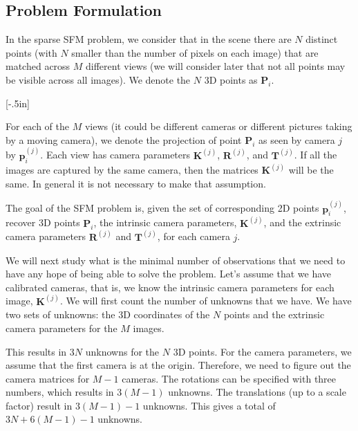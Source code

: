 
\subsection{Problem Formulation}

In the sparse SFM problem, we consider that in the scene there are $N$ distinct points (with $N$ smaller than the number of pixels on each image) that are matched across $M$ different views (we will consider later that not all points may be visible across all images). We denote the $N$ 3D points as $\mathbf{P}_i$.

[-.5in] 

For each of the $M$ views (it could be different cameras or different pictures taking by a moving camera), we denote the projection of point $\mathbf{P}_i$ as seen by camera $j$ by $\mathbf{p}^{(j)}_i$. Each view has camera parameters ${\mathbf K}^{(j)}$, ${\mathbf R}^{(j)}$, and ${\mathbf T}^{(j)}$. If all the images are captured by the same camera, then the matrices ${\mathbf K}^{(j)}$ will be the same. In general it is not necessary to make that assumption.  

The goal of the SFM problem is, given the set of corresponding 2D points $\mathbf{p}^{(j)}_i$, recover 3D points $\mathbf{P}_i$, the intrinsic camera parameters, ${\mathbf K}^{(j)}$, and the extrinsic camera parameters ${\mathbf R}^{(j)}$ and ${\mathbf T}^{(j)}$, for each camera $j$.

We will next study what is the minimal number of observations that we need to have any hope of being able to solve the problem. Let's assume that we have calibrated cameras, that is, we know the intrinsic camera parameters for each image, ${\mathbf K}^{(j)}$. We will first count the number of unknowns that we have. We have two sets of unknowns: the 3D coordinates of the $N$ points and the extrinsic camera parameters for the $M$ images.  

This results in 3$N$ unknowns for the $N$ 3D points. For the camera parameters, we assume that the first camera is at the origin. Therefore, we need to figure out the camera matrices for $M-1$ cameras. The rotations can be specified with three numbers, which results in $3(M-1)$ unknowns. The translations (up to a scale factor) result in  $3(M-1)-1$ unknowns. This gives a total of $3N + 6(M-1)-1$ unknowns.

